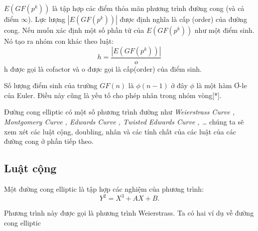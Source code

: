 \documentclass[a4paper,12pt]{report}
\begin{document}
$E(GF(p^k))$ là tập hợp các điểm thỏa mãn phương trình đường cong (và cả điểm $\infty$). Lực lượng $|E(GF(p^k))|$ được định nghĩa là cấp (order) của đường cong. Nếu muốn xác định một số phần tử của 
$E(GF(p^k))$ như một điểm sinh. Nó tạo ra nhóm con khác theo luật:
\begin{displaymath}
h = \frac{|E(GF(p^k))|}{o}
\end{displaymath}
h được gọi là cofactor và o được gọi là cấp(order) của điểm sinh.

Số lượng điểm sinh của trường $GF(n)$ là $\phi (n - 1)$ ở đây $\phi$ là một hàm Ơ-le của Euler. Điều này cũng là yếu tố cho phép nhân trong nhóm vòng[*].

Đường cong elliptic có một số phương trình đường như \textit{Weierstrass Curve , Montgomery Curve , Edwards Curve , Twisted Edwards Curve , \ldots } chúng ta sẽ xem xét các luật cộng, doubling, nhân và các tính chất của các luật của các đường cong ở phần tiếp theo.
\subsection*{Luật cộng}
Một đường cong elliptic là tập hợp các nghiệm của phương trình:
\begin{displaymath}
Y^2 = X^3 + AX + B.
\end{displaymath}

Phương trình này được gọi là phương trình Weierstrass. Ta có hai ví dụ về đường cong elliptic
\end{document}
